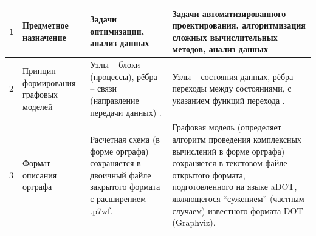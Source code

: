 \begin{landscape}
\begin{longtable}{|p{}|p{}|p{}|p{}|}
    \hline
    1          & Предметное назначение                                                                                                                & Задачи оптимизации, анализ данных                                                                                                                                                                                                                                                                                                                                                                                                                                                                                                                                                     & Задачи автоматизированного проектирования, алгоритмизация сложных вычислительных методов, анализ данных                                                                                                                                                                                                         \\
    \hline
    2          & Принцип формирования графовых моделей                                                                                                & Узлы -- блоки (процессы), рёбра -- связи (направление передачи данных) \cite{NazarenkoDFM2015}.                                                                                                                                                                                                                                                                                                                                                                                                                                                                                       & Узлы -- состояния данных, рёбра -- переходы между состояниями, с указанием функций перехода \cite{SokolovPershin2018}.                                                                                                                                                                                          \\
    \hline
    3          & Формат описания орграфа                                                                                                              & Расчетная схема (в форме орграфа) сохраняется в двоичный файле закрытого формата с расширением \textsf{.p7wf}.                                                                                                                                                                                                                                                                                                                                                                                                                                                                        & Графовая модель (определяет алгоритм проведения комплексных вычислений в форме орграфа) сохраняется в текстовом файле открытого формата, подготовленного на языке \gls{aDOT}\cite{SokolovADOT2020}, являющегося ``сужением'' (частным случаем) известного формата DOT (Graphviz).                               \\

\end{longtable}
\end{landscape}
